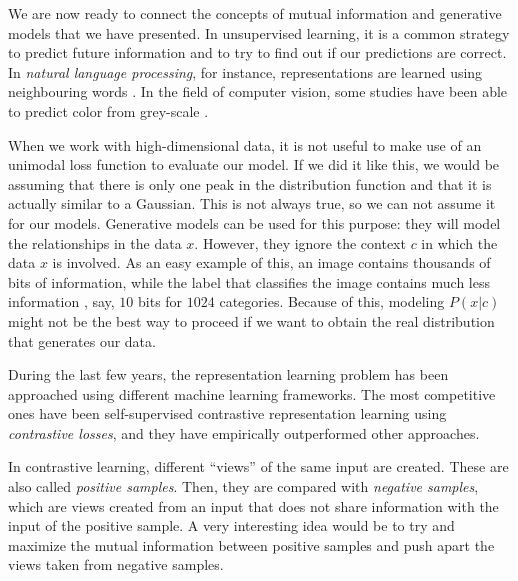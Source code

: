 
\label{Chapter:CPC}
We are now ready to connect the concepts of mutual information and generative models that we have presented. In unsupervised learning,
it is a common strategy to predict future information and to try to find out if our predictions are correct.
In \emph{natural language processing}, for instance, representations are learned 
using neighbouring words \citep{mikolov_efficient_2013}. In the field of computer vision, some studies have been able to predict color from grey-scale \citep{doersch_unsupervised_2016}.

When we work with high-dimensional data, it is not useful to make use of an unimodal loss function to evaluate our model. If we did it like this, we would be assuming that there is only
one peak in the distribution function and that it is actually similar to a Gaussian.  This is not always true, so we can not assume it for our models. Generative models can be used for this purpose:
they will model the relationships in the data $x$. However, they ignore the context $c$ in which the data $x$ is involved. As an easy example of this, an image contains thousands of bits of information,
while the label that classifies the image contains much less information , say, $10$ bits for $1024$ categories. Because of this, modeling $P(x|c)$ might not be the best way to proceed if we want
to obtain the real distribution that generates our data. 

During the last few years, the representation learning problem has been approached using different machine learning frameworks. The most competitive ones have been self-supervised contrastive representation learning \cite{oord_representation_2019,tian_what_2020,hjelm_learning_2019,gutmann_noise-contrastive_nodate,chen_simple_2020,he_momentum_2020} using \emph{contrastive losses}, and they have empirically outperformed other approaches.     

In contrastive learning, different ``views'' of the same input are created. These are also called \emph{positive samples}. Then, they are compared with \emph{negative samples}, which are views created from an input that does not share information with the input of the positive sample. A very interesting idea would be to try and maximize the mutual information between positive samples and push apart the views taken from negative samples. 

